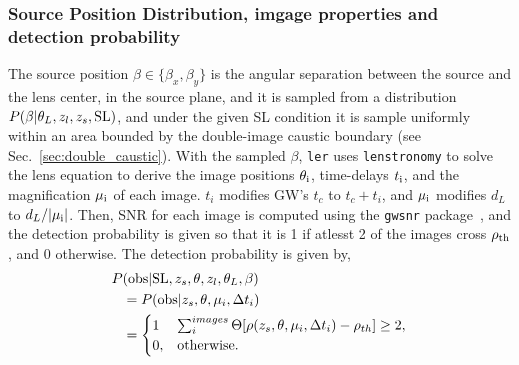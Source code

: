 \documentclass[aps,prd,twocolumn,superscriptaddress,groupedaddress,nofootinbib,showpacs,eqsecnum]{revtex4-1}
\begin{document}
\subsubsection{Source Position Distribution, imgage properties and detection probability}

The source position $\beta\in \{\beta_x, \beta_y\}$ is the angular separation between the source and the lens center, in the source plane, and it is sampled from a distribution $P(\beta|\theta_L, z_l, z_s, {\rm SL})$, and under the given SL condition it is sample uniformly within an area bounded by the double-image caustic boundary (see Sec.~\ref{sec:double_caustic}). With the sampled $\beta$, \texttt{ler} uses \texttt{lenstronomy} \cite{Birrer2018} to solve the lens equation to derive the image positions $\theta_{\rm i}$, time-delays $t_{\rm i}$, and the magnification $\mu_{\rm i}$ of each image. $t_i$ modifies GW's $t_c$ to $t_c + t_i$, and $\mu_{\rm i}$ modifies $d_L$ to $d_L /|\mu_{\rm i}|$. Then, SNR for each image is computed using the \texttt{gwsnr} package~\cite{phurailatpam2025gwsnrpythonpackageefficient}, and the detection probability is given so that it is 1 if atlesst 2 of the images cross $\rho_{\rm th}$, and 0 otherwise. The detection probability is given by,
\begin{align}
P&({\rm obs}|{\rm SL}, z_s, \theta, z_l, \theta_L, \beta) \notag \\
&= P({\rm obs}|z_s,\theta,\mu_i,\Delta t_i) \notag \\
&=
\begin{cases}
1 & \sum_i^{images} \Theta[\rho(z_s,\theta,\mu_i,\Delta t_i)-\rho_{th}]\ge 2, \\
0, & \text{otherwise}.
\end{cases}
\end{align}
\end{document}
